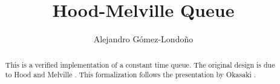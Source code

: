 \documentclass[11pt,a4paper]{article}
\begin{document}
\title{Hood-Melville Queue}
\author{Alejandro G\'omez-Londo\~no}
\maketitle

\begin{abstract}
This is a verified implementation of a constant time queue.
The original design is due to Hood and Melville \cite{ipl/HoodM81}.
This formalization follows the presentation by Okasaki \cite{Okasaki}.
\end{abstract}





\end{document}
